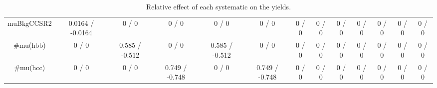 \documentclass[10pt]{article}
\begin{document}
\begin{table}[htbp]
\begin{center}
\begin{tabular}{|c|c|c|c|c|c|c|c|c|c|c|c|c|}
  muBkgCCSR2 & 0.0164 / -0.0164 & 0 / 0 & 0 / 0 & 0 / 0 & 0 / 0 & 0 / 0 & 0 / 0 & 0 / 0 & 0 / 0 & 0 / 0 & 0 / 0 & 0 / 0 \\ 
  #mu(hbb) & 0 / 0 & 0.585 / -0.512 & 0 / 0 & 0.585 / -0.512 & 0 / 0 & 0 / 0 & 0 / 0 & 0 / 0 & 0 / 0 & 0 / 0 & 0 / 0 & 0 / 0 \\ 
  #mu(hcc) & 0 / 0 & 0 / 0 & 0.749 / -0.748 & 0 / 0 & 0.749 / -0.748 & 0 / 0 & 0 / 0 & 0 / 0 & 0 / 0 & 0 / 0 & 0 / 0 & 0 / 0 \\ 
\hline 
\end{tabular} 
\caption{Relative effect of each systematic on the yields.} 
\end{center} 
\end{table} 
\end{document}

